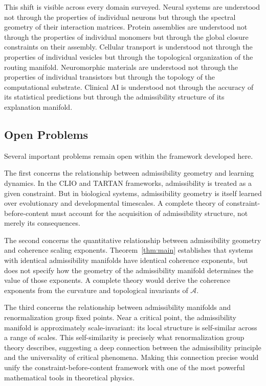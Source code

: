 \documentclass[11pt, oneside]{article}
\numberwithin{equation}{section}
\theoremstyle{rsvpstyle}
\theoremstyle{remark}
\newcommand{\Adm}{\mathcal{A}}
\begin{document}
This shift is visible across every domain surveyed. Neural systems are understood not
through the properties of individual neurons but through the spectral geometry of their
interaction matrices. Protein assemblies are understood not through the properties of
individual monomers but through the global closure constraints on their assembly. Cellular
transport is understood not through the properties of individual vesicles but through
the topological organization of the routing manifold. Neuromorphic materials are
understood not through the properties of individual transistors but through the topology
of the computational substrate. Clinical AI is understood not through the accuracy of
its statistical predictions but through the admissibility structure of its explanation
manifold.

\subsection{Open Problems}

Several important problems remain open within the framework developed here.

The first concerns the relationship between admissibility geometry and learning dynamics.
In the CLIO and TARTAN frameworks, admissibility is treated as a given constraint.
But in biological systems, admissibility geometry is itself learned over evolutionary
and developmental timescales. A complete theory of constraint-before-content must
account for the acquisition of admissibility structure, not merely its consequences.

The second concerns the quantitative relationship between admissibility geometry
and coherence scaling exponents. Theorem~\ref{thm:main} establishes that systems with
identical admissibility manifolds have identical coherence exponents, but does not
specify how the geometry of the admissibility manifold determines the value of those
exponents. A complete theory would derive the coherence exponents from the curvature
and topological invariants of $\Adm$.

The third concerns the relationship between admissibility manifolds and renormalization
group fixed points. Near a critical point, the admissibility manifold is approximately
scale-invariant: its local structure is self-similar across a range of scales. This
self-similarity is precisely what renormalization group theory describes, suggesting
a deep connection between the admissibility principle and the universality of critical
phenomena. Making this connection precise would unify the constraint-before-content
framework with one of the most powerful mathematical tools in theoretical physics.
\end{document}
